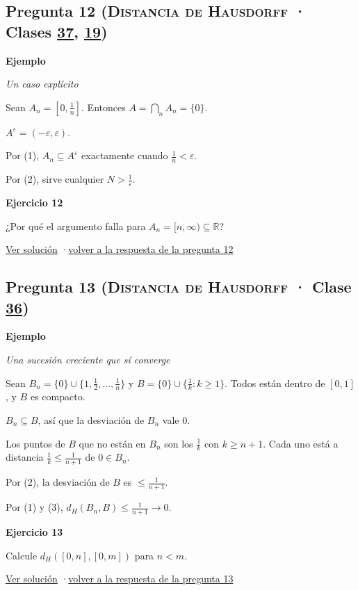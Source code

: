 \documentclass[11pt,a4paper]{article}
\newcommand{\R}{\mathbb{R}}\newcommand{\N}{\mathbb{N}}\newcommand{\Q}{\mathbb{Q}}
\providecommand{\lt}{<}\providecommand{\gt}{>}
\newcommand{\bloque}[1]{\par\smallskip\noindent\textbf{\color{acento}#1}\par}
\begin{document}
\subsection*{\hypertarget{e-12}{}Pregunta 12 \normalfont\small(\textsc{Distancia de Hausdorff} · Clases \href{https://decostruttivismo.github.io/MAT2514-repaso/pdf/MAT2514_apuntes_completos.pdf\#nameddest=section.37}{37}, \href{https://decostruttivismo.github.io/MAT2514-repaso/pdf/MAT2514_apuntes_completos.pdf\#nameddest=section.19}{19})}
\bloque{Ejemplo}
\textit{Un caso explícito}
\begin{pasos}
\item[] Sean $A_n=[0,\frac1n]$. Entonces $A=\bigcap_nA_n=\{0\}$.
\item[(1)] $A^\varepsilon=(-\varepsilon,\varepsilon)$.
\item[(2)] Por (1), $A_n\subseteq A^\varepsilon$ exactamente cuando $\frac1n\lt \varepsilon$.
\item[] Por (2), sirve cualquier $N\gt \frac1\varepsilon$.
\end{pasos}
\bloque{\hypertarget{x-12}{}Ejercicio 12}
¿Por qué el argumento falla para $A_n=[n,\infty)\subseteq\R$?
\par{\small \hyperlink{s-12}{Ver solución} \quad·\quad \hyperlink{r-12}{volver a la respuesta de la pregunta 12}}
\subsection*{\hypertarget{e-13}{}Pregunta 13 \normalfont\small(\textsc{Distancia de Hausdorff} · Clase \href{https://decostruttivismo.github.io/MAT2514-repaso/pdf/MAT2514_apuntes_completos.pdf\#nameddest=section.36}{36})}
\bloque{Ejemplo}
\textit{Una sucesión creciente que sí converge}
\begin{pasos}
\item[] Sean $B_n=\{0\}\cup\{1,\frac12,\dots,\frac1n\}$ y $B=\{0\}\cup\{\frac1k:k\ge1\}$. Todos están dentro de $[0,1]$, y $B$ es compacto.
\item[(1)] $B_n\subseteq B$, así que la desviación de $B_n$ vale $0$.
\item[(2)] Los puntos de $B$ que no están en $B_n$ son los $\frac1k$ con $k\ge n+1$. Cada uno está a distancia $\frac1k\le\frac1{n+1}$ de $0\in B_n$.
\item[(3)] Por (2), la desviación de $B$ es $\le\frac1{n+1}$.
\item[] Por (1) y (3), $d_H(B_n,B)\le\frac1{n+1}\to0$.
\end{pasos}
\bloque{\hypertarget{x-13}{}Ejercicio 13}
Calcule $d_H([0,n],[0,m])$ para $n\lt m$.
\par{\small \hyperlink{s-13}{Ver solución} \quad·\quad \hyperlink{r-13}{volver a la respuesta de la pregunta 13}}
\end{document}

